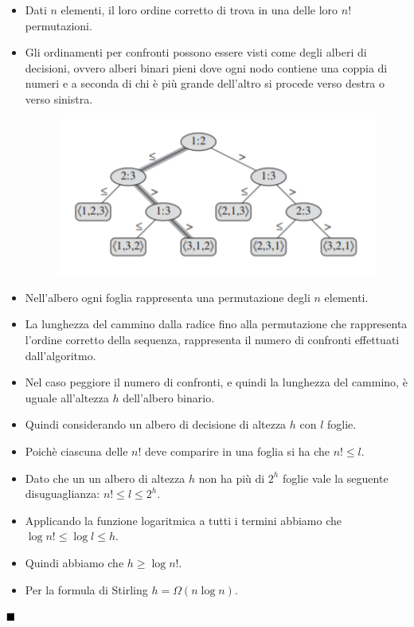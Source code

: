 \documentclass{article}
\begin{document}
\begin{itemize}
    \item Dati $n$ elementi, il loro ordine corretto di trova in una delle loro $n!$ permutazioni.
    \item Gli ordinamenti per confronti possono essere visti come degli alberi di decisioni, ovvero alberi binari pieni dove ogni nodo contiene una coppia di numeri e a seconda di chi è più grande dell'altro si procede verso destra o verso sinistra.
    \begin{figure}[h]
        \includegraphics{img/albero_decisionale.png}
        \centering
    \end{figure}
    \item Nell'albero ogni foglia rappresenta una permutazione degli $n$ elementi.
    \item La lunghezza del cammino dalla radice fino alla permutazione che rappresenta l'ordine corretto della sequenza, rappresenta il numero di confronti effettuati dall'algoritmo.
    \item Nel caso peggiore il numero di confronti, e quindi la lunghezza del cammino, è uguale all'altezza $h$ dell'albero binario.
    \item Quindi considerando un albero di decisione di altezza $h$ con $l$ foglie.
    \item Poichè ciascuna delle $n!$ deve comparire in una foglia si ha che $n! \leq l$.
    \item Dato che un un albero di altezza $h$ non ha più di $2^h$ foglie vale la seguente disuguaglianza: $n! \leq l \leq 2^h$.
    \item Applicando la funzione logaritmica a tutti i termini abbiamo che $\log n! \leq \log l \leq h$.
    \item Quindi abbiamo che $h \geq \log n!$.
    \item Per la formula di Stirling $h = \Omega(n \log n)$.
\end{itemize}

$\hfill\blacksquare$
\end{document}
